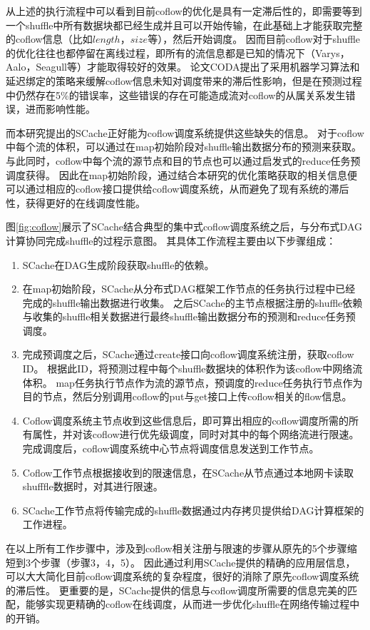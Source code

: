 从上述的执行流程中可以看到目前coflow的优化是具有一定滞后性的，即需要等到一个shuffle中所有数据块都已经生成并且可以开始传输，在此基础上才能获取完整的coflow信息（比如$length$，$size$等），然后开始调度。
因而目前coflow对于shuffle的优化往往也都停留在离线过程，即所有的流信息都是已知的情况下（Varys\cite{varys}，Aalo\cite{aalo}，Seagull\cite{seagull}等）才能取得较好的效果。
论文CODA\cite{coda}提出了采用机器学习算法和延迟绑定的策略来缓解coflow信息未知对调度带来的滞后性影响，但是在预测过程中仍然存在5\%的错误率，这些错误的存在可能造成流对coflow的从属关系发生错误，进而影响性能。

而本研究提出的SCache正好能为coflow调度系统提供这些缺失的信息。
对于coflow中每个流的体积，可以通过在map初始阶段对shuffle输出数据分布的预测来获取。
与此同时，coflow中每个流的源节点和目的节点也可以通过启发式的reduce任务预调度获得。
因此在map初始阶段，通过结合本研究的优化策略获取的相关信息便可以通过相应的coflow接口提供给coflow调度系统，从而避免了现有系统的滞后性，获得更好的在线调度性能。

图\ref{fig:coflow}展示了SCache结合典型的集中式coflow调度系统之后，与分布式DAG计算协同完成shuffle的过程示意图。
其具体工作流程主要由以下步骤组成：

\begin{enumerate}
	\item SCache在DAG生成阶段获取shuffle的依赖。
	\item 在map初始阶段，SCache从分布式DAG框架工作节点的任务执行过程中已经完成的shuffle输出数据进行收集。
	之后SCache的主节点根据注册的shuffle依赖与收集的shuffle相关数据进行最终shuffle输出数据分布的预测和reduce任务预调度。
	\item 完成预调度之后，SCache通过create接口向coflow调度系统注册，获取coflow ID。
	根据此ID，将预测过程中每个shuffle数据块的体积作为该coflow中网络流体积。
	map任务执行节点作为流的源节点，预调度的reduce任务执行节点作为目的节点，然后分别调用coflow的put与get接口上传coflow相关的flow信息。
	\item Coflow调度系统主节点收到这些信息后，即可算出相应的coflow调度所需的所有属性，并对该coflow进行优先级调度，同时对其中的每个网络流进行限速。完成调度后，coflow调度系统中心节点将调度信息发送到工作节点。
	\item Coflow工作节点根据接收到的限速信息，在SCache从节点通过本地网卡读取shufffle数据时，对其进行限速。
	\item SCache工作节点将传输完成的shuffle数据通过内存拷贝提供给DAG计算框架的工作进程。
\end{enumerate}

在以上所有工作步骤中，涉及到coflow相关注册与限速的步骤从原先的5个步骤缩短到3个步骤（步骤3，4，5）。
因此通过利用SCache提供的精确的应用层信息，可以大大简化目前coflow调度系统的复杂程度，很好的消除了原先coflow调度系统的滞后性。
更重要的是，SCache提供的信息与coflow调度所需要的信息完美的匹配，能够实现更精确的coflow在线调度，从而进一步优化shuffle在网络传输过程中的开销。

